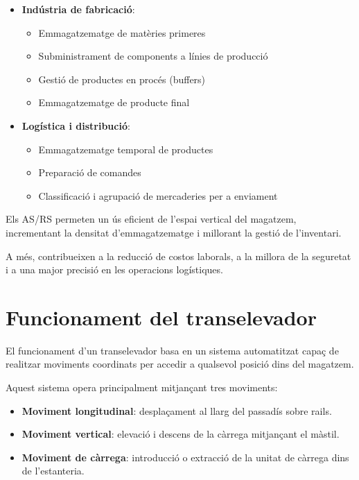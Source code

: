 \documentclass[12pt,a4paper]{report}
\begin{document}
\begin{itemize}
    \item \textbf{Indústria de fabricació}:
    \begin{itemize}
        \item Emmagatzematge de matèries primeres
        \item Subministrament de components a línies de producció
        \item Gestió de productes en procés (buffers)
        \item Emmagatzematge de producte final
    \end{itemize}

    \item \textbf{Logística i distribució}:
    \begin{itemize}
        \item Emmagatzematge temporal de productes
        \item Preparació de comandes
        \item Classificació i agrupació de mercaderies per a enviament
    \end{itemize}
\end{itemize}

Els AS/RS permeten un ús eficient de l'espai vertical del magatzem, incrementant la densitat d'emmagatzematge i millorant la gestió de l'inventari.

A més, contribueixen a la reducció de costos laborals, a la millora de la seguretat i a una major precisió en les operacions logístiques.



\section{Funcionament del transelevador}

El funcionament d'un transelevador \cite{transelevador_info} basa en un sistema automatitzat capaç de realitzar moviments coordinats per accedir a qualsevol posició dins del magatzem.

Aquest sistema opera principalment mitjançant tres moviments:

\begin{itemize}
    \item \textbf{Moviment longitudinal}: desplaçament al llarg del passadís sobre rails.
    \item \textbf{Moviment vertical}: elevació i descens de la càrrega mitjançant el màstil.
    \item \textbf{Moviment de càrrega}: introducció o extracció de la unitat de càrrega dins de l'estanteria.
\end{itemize}
\end{document}
